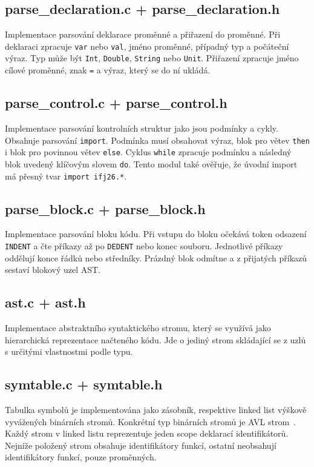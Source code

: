 \subsection*{parse\_declaration.c + parse\_declaration.h}
Implementace parsování deklarace proměnné a přiřazení do proměnné.
Při deklaraci zpracuje \texttt{var} nebo \texttt{val}, jméno proměnné, případný typ a počáteční výraz. Typ může být \texttt{Int}, \texttt{Double}, \texttt{String} nebo \texttt{Unit}. Přiřazení zpracuje jméno cílové proměnné, znak \texttt{=} a výraz, který se do ní ukládá.

\subsection*{parse\_control.c + parse\_control.h}
Implementace parsování kontrolních struktur jako jsou podmínky a cykly. Obsahuje parsování \texttt{import}.
Podmínka musí obsahovat výraz, blok pro větev \texttt{then} i blok pro povinnou větev \texttt{else}. Cyklus \texttt{while} zpracuje podmínku a následný blok uvedený klíčovým slovem \texttt{do}. Tento modul také ověřuje, že úvodní import má přesný tvar \texttt{import ifj26.*}.

\subsection*{parse\_block.c + parse\_block.h}
Implementace parsování bloku kódu.
Při vstupu do bloku očekává token odsazení \texttt{INDENT} a čte příkazy až po \texttt{DEDENT} nebo konec souboru. Jednotlivé příkazy oddělují konce řádků nebo středníky. Prázdný blok odmítne a z přijatých příkazů sestaví blokový uzel AST.

\subsection*{ast.c + ast.h}
Implementace abstraktního syntaktického stromu, který se využívá jako hierarchická reprezentace načteného kódu.
Jde o jediný strom skládající se z uzlů s určitými vlastnostmi podle typu.

\subsection*{symtable.c + symtable.h}
Tabulka symbolů je implementována jako zásobník, respektive linked list výškově vyvá\-žených binárních stromů.
Konkrétní typ binárních stromů je AVL strom~\cite{ial_opora}. Každý strom v linked listu reprezentuje jeden scope deklarací identifikátorů.
Nejníže položený strom obsahuje identifikátory funkcí, ostatní neobsahují identifikátory funkcí, pouze proměnných.


